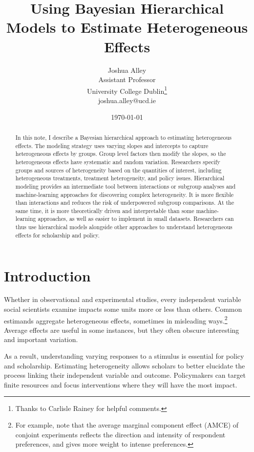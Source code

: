\documentclass[12pt]{article}
\title{\textbf{Using Bayesian Hierarchical Models to Estimate Heterogeneous Effects}}
\author{Joshua Alley \\
Assistant Professor \\
University College Dublin\thanks{Thanks to Carlisle Rainey for helpful comments.} \\
joshua.alley@ucd.ie
}
\date{\today}
\begin{document}
\maketitle 

\begin{abstract} 
In this note, I describe a Bayesian hierarchical approach to estimating heterogeneous effects. 
The modeling strategy uses varying slopes and intercepts to capture heterogeneous effects by groups.
Group level factors then modify the slopes, so the heterogeneous effects have systematic and random variation. 
Researchers specify groups and sources of heterogeneity based on the quantities of interest, including heterogeneous treatments, treatment heterogeneity, and policy issues.  
Hierarchical modeling provides an intermediate tool between interactions or subgroup analyses and machine-learning approaches for discovering complex heterogeneity. 
It is more flexible than interactions and reduces the risk of underpowered subgroup comparisons.
At the same time, it is more theoretically driven and interpretable than some machine-learning approaches, as well as easier to implement in small datasets. 
Researchers can thus use hierarchical models alongside other approaches to understand heterogeneous effects for scholarship and policy.
\end{abstract} 


\newpage 
\doublespace 


\section{Introduction}


Whether in observational and experimental studies, every independent variable social scientists examine impacts some units more or less than others. 
Common estimands aggregate heterogeneous effects, sometimes in misleading ways.\footnote{For example, \citet{Abramsonetal2022} note that the average marginal component effect (AMCE) of conjoint experiments reflects the direction and intensity of respondent preferences, and gives more weight to intense preferences.} 
Average effects are useful in some instances, but they often obscure interesting and important variation. 


As a result, understanding varying responses to a stimulus is essential for policy and scholarship. 
Estimating heterogeneity allows scholars to better elucidate the process linking their independent variable and outcome.
Policymakers can target finite resources and focus interventions where they will have the most impact. 
\end{document}

